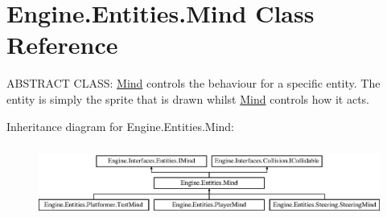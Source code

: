 \hypertarget{a00318}{}\section{Engine.\+Entities.\+Mind Class Reference}
\label{a00318}


A\+B\+S\+T\+R\+A\+CT C\+L\+A\+SS\+: \hyperlink{a00318}{Mind} controls the behaviour for a specific entity. The entity is simply the sprite that is drawn whilst \hyperlink{a00318}{Mind} controls how it acts.  


Inheritance diagram for Engine.\+Entities.\+Mind\+:\begin{figure}[H]
\begin{center}
\leavevmode
\includegraphics[height=2.393162cm]{d2/d41/a00318}
\end{center}
\end{figure}
